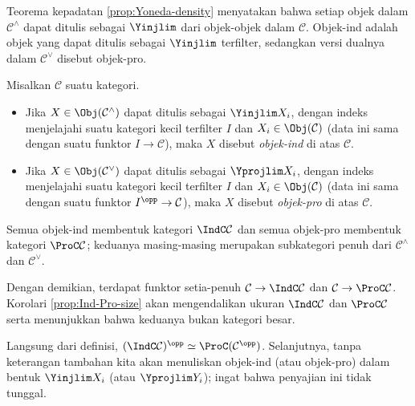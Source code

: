 Teorema kepadatan \ref{prop:Yoneda-density} menyatakan bahwa setiap objek dalam $\mathcal{C}^\wedge$ dapat ditulis sebagai $\Yinjlim$ dari objek-objek dalam $\mathcal{C}$. Objek-ind adalah objek yang dapat ditulis sebagai $\Yinjlim$ terfilter, sedangkan versi dualnya dalam $\mathcal{C}^\vee$ disebut objek-pro.

\begin{definition}
	Misalkan $\mathcal{C}$ suatu kategori.
	\begin{itemize}
		\item Jika $X\in\Obj(\mathcal{C}^\wedge)$ dapat ditulis sebagai $\Yinjlim X_i$, dengan indeks menjelajahi suatu kategori kecil terfilter $I$ dan $X_i\in\Obj(\mathcal{C})$ (data ini sama dengan suatu funktor $I\to\mathcal{C}$), maka $X$ disebut \emph{objek-ind} di atas $\mathcal{C}$.
		
		\item Jika $X\in\Obj(\mathcal{C}^\vee)$ dapat ditulis sebagai $\Yprojlim X_i$, dengan indeks menjelajahi suatu kategori kecil terfilter $I$ dan $X_i\in\Obj(\mathcal{C})$ (data ini sama dengan suatu funktor $I^{\opp}\to\mathcal{C}$), maka $X$ disebut \emph{objek-pro} di atas $\mathcal{C}$.
	\end{itemize}
	
	Semua objek-ind membentuk kategori $\IndC\mathcal{C}$ dan semua objek-pro membentuk kategori $\ProC\mathcal{C}$; keduanya masing-masing merupakan subkategori penuh dari $\mathcal{C}^\wedge$ dan $\mathcal{C}^\vee$.
\end{definition}

Dengan demikian, terdapat funktor setia-penuh
$\mathcal{C}\to\IndC\mathcal{C}$ dan
$\mathcal{C}\to\ProC\mathcal{C}$. Korolari \ref{prop:Ind-Pro-size} akan
mengendalikan ukuran $\IndC\mathcal{C}$ dan $\ProC\mathcal{C}$ serta
menunjukkan bahwa keduanya bukan kategori besar.

Langsung dari definisi, $(\IndC\mathcal{C})^{\opp}\simeq\ProC(\mathcal{C}^{\opp})$. Selanjutnya, tanpa keterangan tambahan kita akan menuliskan objek-ind (atau objek-pro) dalam bentuk $\Yinjlim X_i$ (atau $\Yprojlim Y_i$); ingat bahwa penyajian ini tidak tunggal.

